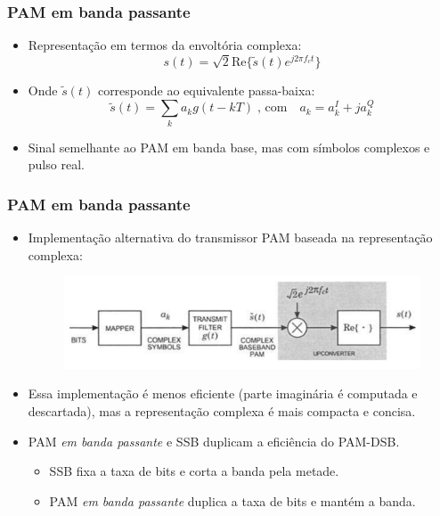 \begin{frame}
	\frametitle{PAM em banda passante}

	\begin{itemize}
	  \item Representação em termos da envoltória complexa:
	  \begin{equation*}
	      s(t) = \sqrt{2} \mathrm{Re}\{ \tilde{s}(t)e^{j2\pi f_c t} \}
	  \end{equation*}
	  \item Onde $\tilde{s}(t)$ corresponde ao equivalente passa-baixa:
	  \begin{equation*}
	      \tilde{s}(t) = \sum_k a_k g(t-kT) \; \text{, com} \quad a_k = a_k^I + j a_k^Q
	  \end{equation*}
	  \item Sinal semelhante ao PAM em banda base, mas com símbolos complexos e pulso real.
	\end{itemize}	
\end{frame}

\begin{frame}
	\frametitle{PAM em banda passante}

	\begin{itemize}
	  \item Implementação alternativa do transmissor PAM baseada na representação complexa:
	    \begin{figure}[t]	
	      \begin{center}
		\includegraphics[width=0.75\columnwidth]{figs/pam_15}
	      \end{center}
	    \end{figure}
	   \item Essa implementação é menos eficiente (parte imaginária é computada e descartada), mas a representação complexa é mais compacta e concisa.
	   \item PAM \textit{em banda passante} e SSB duplicam a eficiência do PAM-DSB.
	  \begin{itemize}
	    \item SSB fixa a taxa de bits e corta a banda pela metade.
	    \item PAM \textit{em banda passante} duplica a taxa de bits e mantém a banda.
	  \end{itemize}
	\end{itemize}	
\end{frame}

